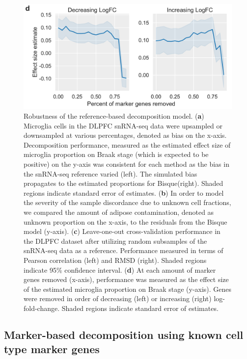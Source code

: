 \begin{figure}
\includegraphics[scale=0.27]{chapter2/figures/supp_fig_5e.pdf}
\caption{
        Robustness of the reference-based decomposition model. 
        (\textbf{a}) Microglia cells in the DLPFC snRNA-seq data were upsampled or downsampled at various percentages, denoted as bias on the x-axis. Decomposition performance, measured as the estimated effect size of microglia proportion on Braak stage (which is expected to be positive) on the y-axis was consistent for each method as the bias in the snRNA-seq reference varied (left). The simulated bias propagates to the estimated proportions for Bisque(right). Shaded regions indicate standard error of estimates.  
        (\textbf{b}) In order to model the severity of the sample discordance due to unknown cell fractions, we compared the amount of adipose contamination, denoted as unknown proportion on the x-axis, to the residuals from the Bisque model (y-axis).
        (\textbf{c}) Leave-one-out cross-validation performance in the DLPFC dataset after utilizing random subsamples of the snRNA-seq data as a reference. Performance measured in terms of Pearson correlation (left) and RMSD (right). Shaded regions indicate 95\% confidence interval.
        (\textbf{d}) At each amount of marker genes removed (x-axis), performance was measured as the effect size of the estimated microglia proportion on Braak stage (y-axis). Genes were removed in order of decreasing (left) or increasing (right) log-fold-change. Shaded regions indicate standard error of estimates.
        }
\label{fig:supfig5}
\end{figure}

\subsection{Marker-based decomposition using known cell type marker genes }

